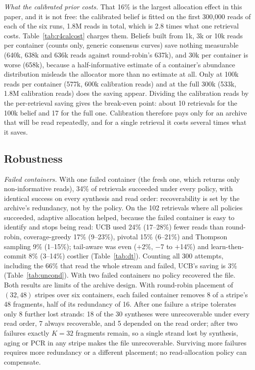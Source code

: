 \documentclass[acmsmall,screen]{acmart}
\begin{document}

\emph{What the calibrated prior costs.}  That 16\% is the largest allocation effect in this paper, and
it is not free: the calibrated belief is fitted on the first 300{,}000 reads of each of the six runs,
1.8M reads in total, which is 2.8 times what one retrieval costs.  Table~\ref{tab:r4calcost} charges
them.  Beliefs built from 1k, 3k or 10k reads per container (counts only, generic consensus curves)
save nothing measurable (640k, 638k and 636k reads against round-robin's 637k), and 30k per container is
worse (658k), because a half-informative estimate of a container's abundance distribution misleads the
allocator more than no estimate at all.  Only at 100k reads per container (577k, 600k calibration reads)
and at the full 300k (533k, 1.8M calibration reads) does the saving appear.  Dividing the calibration
reads by the per-retrieval saving gives the break-even point: about 10 retrievals for the 100k belief and
17 for the full one.  Calibration therefore pays only for an archive that will be read repeatedly, and for
a single retrieval it costs several times what it saves.

\subsection{Robustness}\label{sec:res-robust}\label{sec:res-fail}\label{sec:res-uncond}
\emph{Failed containers.}  With one failed container (the fresh one, which returns only non-informative
reads), 34\% of retrievals succeeded under every policy, with identical success on every synthesis and
read order: recoverability is set by the archive's redundancy, not by the policy.  On the 102 retrievals
where all policies succeeded, adaptive allocation helped, because the failed container is easy to
identify and stops being read: UCB used 24\% (17--28\%) fewer reads than round-robin, coverage-greedy
17\% (9--23\%), pivotal 15\% (6--21\%) and Thompson sampling 9\% (1--15\%); tail-aware was even ($+$2\%, $-$7 to $+$14\%) and
learn-then-commit 8\% (3--14\%) costlier (Table~\ref{tab:dt}).  Counting all 300 attempts, including the
66\% that read the whole stream and failed, UCB's saving is 3\% (Table~\ref{tab:uncond}).
With two failed containers no policy recovered the file.  Both results are limits of the archive design.
With round-robin placement of $(32,48)$ stripes over six containers, each failed container removes 8 of a
stripe's 48 fragments, half of its redundancy of 16.  After one failure a stripe tolerates only 8 further
lost strands: 18 of the 30 syntheses were unrecoverable under every read order, 7 always recoverable, and
5 depended on the read order; after two failures exactly $K{=}32$ fragments remain, so a single strand
lost by synthesis, aging or PCR in any stripe makes the file unrecoverable.  Surviving more failures
requires more redundancy or a different placement; no read-allocation policy can compensate.
\end{document}
